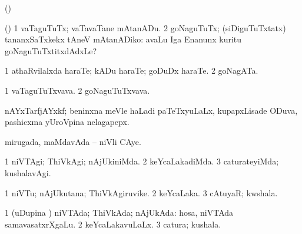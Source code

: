 \bentry
{}
\gl{\saMkiSx}
\bmng
(\birx)  
\emng
\eentry

\bentry
{}
\gl{\akirx}
\bmng
(\AmA) 
\bnum
\num{1} vaTaguTuTx; vaTavaTane mAtanADu. 
\num{2} goNaguTuTx; (siDiguTuTxtatx) tananxSaTxkekx tAneV mAtanADiko:  avaLu Iga Enanunx kuritu goNaguTuTxtitxdAdxLe? 
\enum
\emng
\eentry

\bentry
{}
\gl{\nA}
\bmng
\bnum
\num{1} athaRvilalxda haraTe; kADu haraTe; goDuDx haraTe. 
\num{2} goNagATa. 
\enum
\emng
\eentry

\bentry
{}
\gl{\nA}
\bmng
\bnum
\num{1} vaTaguTuTxvava. 
\num{2} goNaguTuTxvava. 
\enum
\emng
\eentry

\bentry
{}
\gl{\nA}
\bmng
nAYxTarfjAYxkf; beninxna meVle haLadi paTeTxyuLaLx, kupapxLisade ODuva, pashicxma yUroVpina nelagapepx. 
\emng
\eentry

\bentry
{}
\gl{\nA}
\bmng
mirugada, maMdavAda -- niVli CAye. 
\emng
\eentry

\bentry
{}
\gl{\kirxvi}
\bmng
\bnum
\num{1} niVTAgi; ThiVkAgi; nAjUkiniMda. 
\num{2} keYcaLakadiMda. 
\num{3} caturateyiMda; kushalavAgi. 
\enum
\emng
\eentry

\bentry
{}
\gl{\nA}
\bmng
\bnum
\num{1} niVTu; nAjUkutana; ThiVkAgiruvike. 
\num{2} keYcaLaka. 
\num{3} cAtuyaR; kwshala. 
\enum
\emng
\eentry

\bentry
{}
\gl{\gu}
\bmng
\bnum
\num{1} (uDupina \vi) niVTAda; ThiVkAda; nAjUkAda:  hosa, niVTAda samavasatxrXgaLu. 
\num{2} keYcaLakavuLaLx. 
\num{3} catura; kushala. 
\enum
\emng
\eentry

